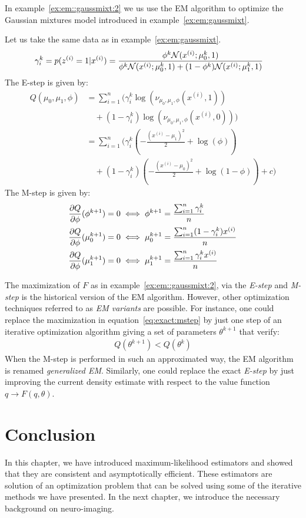 In example~\ref{ex:em::gaussmixt:2} we us use the EM algorithm to optimize the Gaussian mixtures model introduced in example~\eqref{ex:em:gaussmixt}.
\begin{example}
  \label{ex:em::gaussmixt:2}
  Let us take the same data as in example~\ref{ex:em:gaussmixt}.
  \begin{align}
    \gamma_i^k = p(z^{(i)} = 1 | x^{(i)}) &= \frac{\phi^k \mathcal{N}(x^{(i)}; \mu_0^k, 1)}{ \phi^k \mathcal{N}(x^{(i)}; \mu_0^k, 1) + (1 - \phi^k) \mathcal{N}(x^{(i)}; \mu_1^k, 1)} 
  \end{align}
  The E-step is given by:
  \begin{align}
    Q(\mu_0, \mu_1, \phi) &= \sum_{i=1}^n \Big( \gamma_i^k \log(\nu_{\mu_0, \mu_1, \phi}(x^{(i)}, 1)) \\ &\enspace \enspace + (1 - \gamma_i^k) \log(\nu_{\mu_0, \mu_1, \phi}(x^{(i)}, 0)) \Big) \\
              &= \sum_{i=1}^n \Big( \gamma_i^k( -\frac{(x^{(i)} - \mu_1)^2}{2} + \log(\phi)) \\ &\enspace \enspace + (1 - \gamma_i^k) ( -\frac{(x^{(i)} - \mu_0)^2}{2} + \log(1 -\phi)) + c \Big)
 \end{align}
 The M-step is given by:
 \begin{align}
   &\frac{ \partial Q}{\partial \phi}(\phi^{k + 1}) = 0 \iff \phi^{k + 1} = \frac{\sum_{i=1}^n \gamma_i^k}{n} \\
   &\frac{ \partial Q}{\partial \phi}(\mu^{k+1}_0) = 0 \iff \mu^{k + 1}_0 = \frac{\sum_{i=1}^n (1 - \gamma_i^k) x^{(i)}}{n} \\
   &\frac{ \partial Q}{\partial \phi}(\mu^{k+1}_1) = 0 \iff \mu^{k + 1}_1 = \frac{\sum_{i=1}^n \gamma_i^k x^{(i)}}{n} \\
 \end{align}
\end{example}


The maximization of $F$ as in example~\ref{ex:em::gaussmixt:2}, via the \emph{E-step} and \emph{M-step} is the
historical version of the EM algorithm. However, other optimization techniques
referred to as \emph{EM variants}
are possible. For instance, one could replace the maximization in
equation~\eqref{eq:exact:mstep} by just one step of an iterative optimization
algorithm giving a set of parameters $\theta^{k+1}$ that verify:
\begin{align}
  Q(\theta^{k+1}) < Q(\theta^k) 
\end{align}
When the M-step is performed in such an approximated way, the EM algorithm
is renamed \emph{generalized EM}.
Similarly, one could replace the exact \emph{E-step} by just improving the
current density estimate with respect to the value function $q \rightarrow F(q,
\theta)$.

\section{Conclusion}
In this chapter, we have introduced maximum-likelihood estimators and showed
that they are consistent and asymptotically efficient. These estimators are
solution of an optimization problem that can be solved using some of the
iterative methods we have presented.
In the next chapter, we introduce the necessary background on neuro-imaging.
